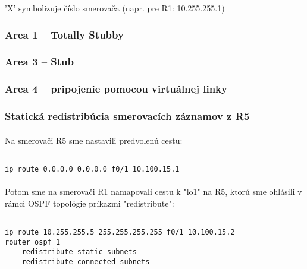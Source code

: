 \documentclass[12pt,twoside,a4paper]{article}
\begin{document}
'X' symbolizuje číslo smerovača (napr. pre R1: 10.255.255.1)



\subsubsection*{Area 1 – Totally Stubby}

\subsubsection*{Area 3 – Stub}

\subsubsection*{Area 4 – pripojenie pomocou virtuálnej linky}

\subsubsection*{Statická redistribúcia smerovacích záznamov z R5}
\paragraph{}
Na smerovači R5 sme nastavili predvolenú cestu:

\noindent
{\selectfont
\begin{small}
\begin{verbatim}

ip route 0.0.0.0 0.0.0.0 f0/1 10.100.15.1

\end{verbatim}
\end{small}
}

\paragraph{}
Potom sme na smerovači R1 namapovali cestu k "lo1" na R5, ktorú sme ohlásili v rámci OSPF topológie príkazmi "redistribute":

\noindent
{\selectfont
\begin{small}
\begin{verbatim}

ip route 10.255.255.5 255.255.255.255 f0/1 10.100.15.2
router ospf 1
    redistribute static subnets
    redistribute connected subnets

\end{verbatim}
\end{small}
}
\end{document}
